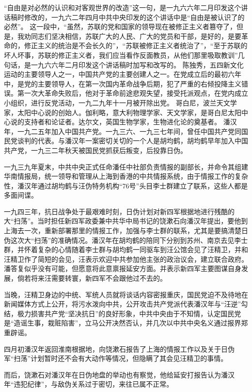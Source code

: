 \begin{maonote}
“自由是对必然的认识和对客观世界的改造”这一句，是一九六六年二月印发这个讲话稿时修改的，一九六二年四月中共中央印发的这个讲话中是“自由是被认识了的必然”。
这一段中，“虽然，苏联的党和国家的领导现在被修正主义者篡夺了，但是，我劝同志们坚决相信，苏联广大的人民、广大的党员和干部，是好的，是要革命的，修正主义的统治是不会长久的”，“苏联被修正主义者统治了”，“至于苏联的坏人坏事，苏联的修正主义者，我们应当看作反面教员，从他们那里吸取教训”几句话，是一九六六年二月印发这个讲话稿时加写和改写的。
陈独秀，五四新文化运动的主要领导人之一，中国共产党的主要创建人之一。在党成立后的最初六年中，是党的主要领导人，在第一次国内革命战争后期，犯了严重的右倾投降主义错误。第一次大革命失败后，他对于革命前途悲观失望，接受托派观点，在党内成立小组织，进行反党活动，一九二九年十一月被开除出党。
哥白尼，波兰天文学家，太阳中心说的创始人。伽利略，意大利物理学家、天文学家，是哥白尼太阳中心说的支持者和论证者。达尔文，英国生物学家，生物进化论的奠基者。
潘汉年，一九二五年加入中国共产党。一九三六、一九三七年间，曾任中国共产党同国民党谈判的代表。与潘汉年一案密切关切的一个人是胡均鹤，胡均鹤早年加入中国共产党，一九三二年秋天被国民党抓获后叛变，后投靠日伪。

一九三九年夏末，中共中央正式任命潘任中社部负责情报的副部长，并命令其组建华南情报局，统一领导和管理从上海到香港的中共情报系统，由于情报工作的复杂性，潘汉年通过胡均鹤与汪伪特务机构“76号”头目李士群建立了联系，这些人都是多面间谍。

一九四三年，抗日战争处于最艰难时刻，日伪计划对新四军根据地进行残酷的大“扫荡”。当时担任新四军政委兼中共华中局书记的饶漱石向潘汉年提出，要他到上海去一次，重新部署那里的情报工作，加强与李士群的联系，尤其是要搞清楚日伪这次大“扫荡”的准确情况。潘汉年在胡均鹤的陪同下分别到苏州、南京去见李士群，并怀着复杂的心情随着李士群与胡均鹤一同驱车到汪公馆会见了汪精卫，并和汪精卫作了简短的会见，汪表示欢迎中共参加他主张的政治议会，建立联合政府。潘答复似乎没有可能，但愿意将此意禀报延安方面。并表示新四军主要图谋自身发展，倘若将来汪需要转寰，新四军不会跟他过不去的。

当晚，汪精卫身边的中统、军统人员就将谈话内容密报重庆，国民党迫不及待地在新闻媒体方式上公开，将污水泼向中共，公开攻击共产党派代表潘汉年与“汪逆”勾结，极力损害共产党“坚决抗日”的良好形象，中共中央由于不知情，认定国民党是“造谣生事，栽赃陷害”，立马公开决然否认，并几次以中共中央名义通过报界郑重辟谣。

四月初潘汉年返回淮南根据地，向饶漱石报告了上海的情报工作以及关于日伪军“扫荡”计划暂时还不会有大动作等情况，但隐瞒了其会见汪精卫的事情。

而后，饶漱石对潘汉年在日伪地盘的举动也有察觉，他给延安打报告认为潘汉年“违犯纪律”，与敌伪关系过于密切，来往已属不正常。


\end{maonote}
